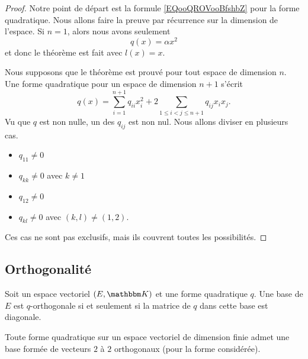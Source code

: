 \begin{proof}
    Notre point de départ est la formule \eqref{EQooQROVooBfshbZ} pour la forme quadratique. Nous allons faire la preuve par récurrence sur la dimension de l'espace. Si \( n=1\), alors nous avons seulement
    \begin{equation}
        q(x)=\alpha x^2
    \end{equation}
    et donc le théorème est fait avec \( l(x)=x\).

    Nous supposons que le théorème est prouvé pour tout espace de dimension \( n\). Une forme quadratique pour un espace de dimension \( n+1\) s'écrit
    \begin{equation}
        q(x)=\sum_{i=1}^{n+1}q_{ii}x_i^2+2\sum_{1\leq i < j\leq n+1}q_{ij}x_ix_j.
    \end{equation}
    Vu que \( q\) est non nulle, un des \( q_{ij}\) est non nul. Nous allons diviser en plusieurs cas.
    \begin{itemize}
        \item
            \( q_{11}\neq 0\)
        \item
            \( q_{kk}\neq 0\) avec \( k\neq 1\)
        \item
            \( q_{12}\neq 0\)
        \item
            \( q_{kl}\neq 0\) avec \( (k,l)\neq (1,2)\).
    \end{itemize}
    Ces cas ne sont pas exclusifs, mais ils couvrent toutes les possibilités.
\end{proof}


\subsection{Orthogonalité}

\begin{proposition}
    Soit un espace vectoriel \( (E,\eK)\) et une forme quadratique \( q\). Une base de \( E\) est \( q\)-orthogonale si et seulement si la matrice de \( q\) dans cette base est diagonale.
\end{proposition}


\begin{theorem}       \label{THOooIDMPooIMwkqB}
    Toute forme quadratique sur un espace vectoriel de dimension finie admet une base formée de vecteurs \( 2\) à \( 2\) orthogonaux (pour la forme considérée).
\end{theorem}
  

